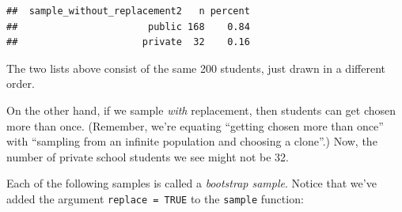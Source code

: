 \documentclass[
]{book}
\newenvironment{Shaded}{\begin{snugshade}}{\end{snugshade}}
\newcommand{\AttributeTok}[1]{\textcolor[rgb]{0.77,0.63,0.00}{#1}}
\newcommand{\ConstantTok}[1]{\textcolor[rgb]{0.00,0.00,0.00}{#1}}
\newcommand{\DecValTok}[1]{\textcolor[rgb]{0.00,0.00,0.81}{#1}}
\newcommand{\FunctionTok}[1]{\textcolor[rgb]{0.00,0.00,0.00}{#1}}
\newcommand{\NormalTok}[1]{#1}
\newcommand{\OtherTok}[1]{\textcolor[rgb]{0.56,0.35,0.01}{#1}}
\newcommand{\SpecialCharTok}[1]{\textcolor[rgb]{0.00,0.00,0.00}{#1}}
\begin{document}
\begin{verbatim}
##  sample_without_replacement2   n percent
##                       public 168    0.84
##                      private  32    0.16
\end{verbatim}

The two lists above consist of the same 200 students, just drawn in a different order.

On the other hand, if we sample \emph{with} replacement, then students can get chosen more than once. (Remember, we're equating ``getting chosen more than once'' with ``sampling from an infinite population and choosing a clone''.) Now, the number of private school students we see might not be 32.

Each of the following samples is called a \emph{bootstrap sample}. Notice that we've added the argument \texttt{replace\ =\ TRUE} to the \texttt{sample} function:

\begin{Shaded}
\end{Shaded}
\end{document}

